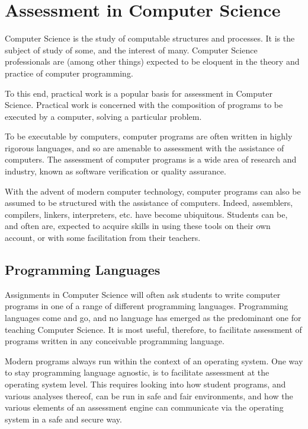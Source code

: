 
\section{Assessment in Computer Science}

Computer Science is the study of computable structures and processes. It is the
subject of study of some, and the interest of many. Computer Science
professionals are (among other things) expected to be eloquent in the theory
and practice of computer programming\cite{cs-curricula-2013}.

To this end, practical work is a popular basis for assessment in Computer
Science\cite{carter-et-al-2003}. Practical work is concerned with the
composition of programs to be executed by a computer, solving a particular
problem.

To be executable by computers, computer programs are often written in highly
rigorous languages, and so are amenable to assessment with the assistance of
computers. The assessment of computer programs is a wide area of research and
industry, known as software verification or quality assurance.

With the advent of modern computer technology, computer programs can also be
assumed to be structured with the assistance of computers. Indeed, assemblers,
compilers, linkers, interpreters, etc. have become ubiquitous. Students can be,
and often are, expected to acquire skills in using these tools on their own
account, or with some facilitation from their teachers.

\subsection{Programming Languages}

Assignments in Computer Science will often ask students to write computer
programs in one of a range of different programming languages. Programming
languages come and go, and no language has emerged as the predominant one for
teaching Computer Science. It is most useful, therefore, to facilitate
assessment of programs written in any conceivable programming language.

Modern programs always run within the context of an operating system. One way
to stay programming language agnostic, is to facilitate assessment at the
operating system level. This requires looking into how student programs, and
various analyses thereof, can be run in safe and fair environments, and how the
various elements of an assessment engine can communicate via the operating
system in a safe and secure way.

